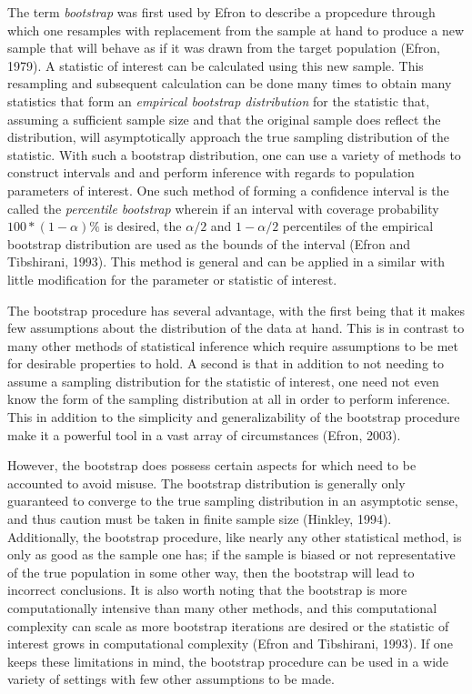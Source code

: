 		The term \textit{bootstrap} was first used by Efron to describe a propcedure through which one resamples with replacement from the sample at hand to produce a new sample that will behave as if it
		was drawn from the target population (Efron, 1979). A statistic of interest can be calculated using this new sample. This resampling and subsequent calculation can be done many times to obtain many statistics that form an
		\textit{empirical bootstrap distribution} for the statistic that, assuming a sufficient sample size and that the original sample does reflect the distribution, will asymptotically approach the
		true sampling distribution of the statistic. With such a bootstrap distribution, one can use a variety of methods to construct intervals and and perform inference with regards to population
		parameters of interest. One such method of forming a confidence interval is the called the \textit{percentile bootstrap} wherein if an interval with coverage probability $100*(1-\alpha) \%$ is
		desired, the $\alpha/2$ and $1-\alpha/2$ percentiles of the empirical bootstrap distribution are used as the bounds of the interval (Efron and Tibshirani, 1993). This method is general and
		can be applied in a similar with little modification for the parameter or statistic of interest.

		The bootstrap procedure has several advantage, with the first being that it makes few assumptions about the distribution of the data at hand. This is in contrast to many other methods of
		statistical inference which require assumptions to be met for desirable properties to hold. A second is that in addition to not needing to assume a sampling distribution for the statistic
		of interest, one need not even know the form of the sampling distribution at all in order to perform inference. This in addition to the simplicity and generalizability of the bootstrap procedure
		make it a powerful tool in a vast array of circumstances  (Efron, 2003).

		However, the bootstrap does possess certain aspects for which need to be accounted to avoid misuse. The bootstrap distribution is generally only guaranteed to converge to the true sampling
		distribution in an asymptotic sense, and thus caution must be taken in finite sample size (Hinkley, 1994). Additionally, the bootstrap procedure, like nearly any other statistical method,
		is only as good as the sample one has; if the sample is biased or not representative of the true population in some other way, then the bootstrap will lead to incorrect conclusions. It is also
		worth noting that the bootstrap is more computationally intensive than many other methods, and this computational complexity can scale as more bootstrap iterations are desired or the statistic
		of interest grows in computational complexity (Efron and Tibshirani, 1993). If one keeps these limitations in mind, the bootstrap procedure can be used in a wide variety of settings with few
		other assumptions to be made.


